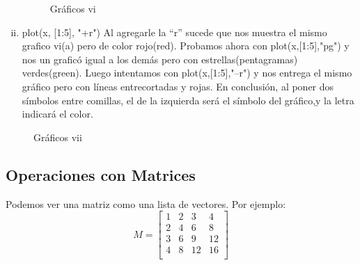 \documentclass[a4paper]{article}
\begin{document}
\begin{enumerate}[i)]
\begin{figure} [H]
 \centering
 \caption{Gráficos vi}
 \label{f:Gráficos vi}
\end{figure}
\item plot(x, [1:5], "+r") Al agregarle la “r” sucede que nos muestra el mismo grafico vi(a) pero de color rojo(red). Probamos ahora con  plot(x,[1:5],"pg") y nos un graficó igual a los demás pero con estrellas(pentagramas) verdes(green). Luego intentamos con  plot(x,[1:5],"--r") y nos entrega el mismo gráfico pero con líneas entrecortadas y rojas. En conclusión, al poner dos símbolos entre comillas, el de la izquierda será el símbolo del gráfico,y la letra indicará el color. 
\end{enumerate}
\begin{figure} [H]
 \centering
 \caption{Gráficos vii}
 \label{f:Gráficos vii}
\end{figure}



\subsection{Operaciones con Matrices}

Podemos ver una matriz como una lista de vectores. Por ejemplo: 
 \[
   M=
  \left[ {\begin{array}{cccc}
   1 & 2 & 3 & 4 \\
   2 & 4 & 6 & 8 \\
   3 & 6 & 9 & 12 \\
   4 & 8 & 12 & 16 \\
   \end{array} } \right]
\]
\end{document}
